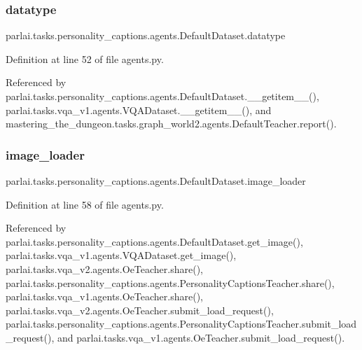 \subsubsection{\texorpdfstring{datatype}{datatype}}
{\footnotesize\ttfamily parlai.\+tasks.\+personality\+\_\+captions.\+agents.\+Default\+Dataset.\+datatype}



Definition at line 52 of file agents.\+py.



Referenced by parlai.\+tasks.\+personality\+\_\+captions.\+agents.\+Default\+Dataset.\+\_\+\+\_\+getitem\+\_\+\+\_\+(), parlai.\+tasks.\+vqa\+\_\+v1.\+agents.\+V\+Q\+A\+Dataset.\+\_\+\+\_\+getitem\+\_\+\+\_\+(), and mastering\+\_\+the\+\_\+dungeon.\+tasks.\+graph\+\_\+world2.\+agents.\+Default\+Teacher.\+report().

\mbox{\label{classparlai_1_1tasks_1_1personality__captions_1_1agents_1_1DefaultDataset_ae8aa6d7d5869a14df29403626d053b0f}} 
\subsubsection{\texorpdfstring{image\+\_\+loader}{image\_loader}}
{\footnotesize\ttfamily parlai.\+tasks.\+personality\+\_\+captions.\+agents.\+Default\+Dataset.\+image\+\_\+loader}



Definition at line 58 of file agents.\+py.



Referenced by parlai.\+tasks.\+personality\+\_\+captions.\+agents.\+Default\+Dataset.\+get\+\_\+image(), parlai.\+tasks.\+vqa\+\_\+v1.\+agents.\+V\+Q\+A\+Dataset.\+get\+\_\+image(), parlai.\+tasks.\+vqa\+\_\+v2.\+agents.\+Oe\+Teacher.\+share(), parlai.\+tasks.\+personality\+\_\+captions.\+agents.\+Personality\+Captions\+Teacher.\+share(), parlai.\+tasks.\+vqa\+\_\+v1.\+agents.\+Oe\+Teacher.\+share(), parlai.\+tasks.\+vqa\+\_\+v2.\+agents.\+Oe\+Teacher.\+submit\+\_\+load\+\_\+request(), parlai.\+tasks.\+personality\+\_\+captions.\+agents.\+Personality\+Captions\+Teacher.\+submit\+\_\+load\+\_\+request(), and parlai.\+tasks.\+vqa\+\_\+v1.\+agents.\+Oe\+Teacher.\+submit\+\_\+load\+\_\+request().


